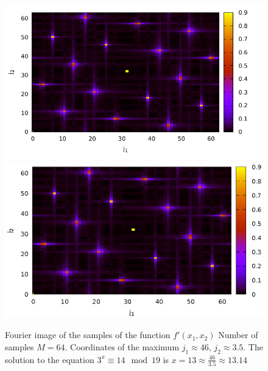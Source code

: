 \begin{figure}
\centering

\ifpdf
\includegraphics[angle=0]
{./part4/quantcomp/picdiscretlog3.pdf}
\else
\includegraphics[angle=0]
{./part4/quantcomp/picdiscretlog3.eps}
\fi

%

\caption{Fourier image of the samples of the function 
$f'(x_1, x_2)$
Number of samples $M=64$. Coordinates of the maximum $j_1 \approx 46$, $j_2 \approx 3.5$. 
The solution to the equation $3^x \equiv 14 \mod 19$
is $x = 13 \approx \frac{46}{3.5} \approx 13.14$
} 
\label{fig:part4:quantcomp:dl3}
\end{figure}